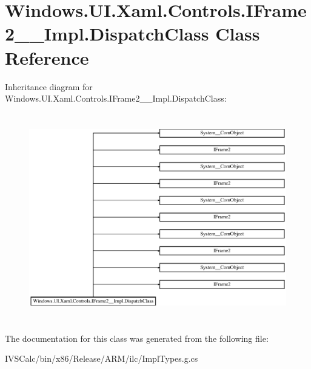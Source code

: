 \hypertarget{class_windows_1_1_u_i_1_1_xaml_1_1_controls_1_1_i_frame2_____impl_1_1_dispatch_class}{}\section{Windows.\+U\+I.\+Xaml.\+Controls.\+I\+Frame2\+\_\+\+\_\+\+Impl.\+Dispatch\+Class Class Reference}
\label{class_windows_1_1_u_i_1_1_xaml_1_1_controls_1_1_i_frame2_____impl_1_1_dispatch_class}
Inheritance diagram for Windows.\+U\+I.\+Xaml.\+Controls.\+I\+Frame2\+\_\+\+\_\+\+Impl.\+Dispatch\+Class\+:\begin{figure}[H]
\begin{center}
\leavevmode
\includegraphics[height=9.112427cm]{class_windows_1_1_u_i_1_1_xaml_1_1_controls_1_1_i_frame2_____impl_1_1_dispatch_class}
\end{center}
\end{figure}


The documentation for this class was generated from the following file\+:\begin{DoxyCompactItemize}
\item 
I\+V\+S\+Calc/bin/x86/\+Release/\+A\+R\+M/ilc/Impl\+Types.\+g.\+cs\end{DoxyCompactItemize}
